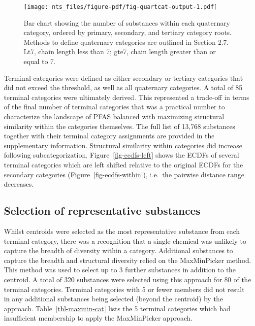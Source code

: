 \documentclass[
  super,
  preprint,
  3p]{elsarticle}
\begin{document}
\begin{figure}

{\centering \texttt{[image: nts\_files/figure-pdf/fig-quartcat-output-1.pdf]}

}

\caption{\label{fig-quartcat}Bar chart showing the number of substances
within each quaternary category, ordered by primary, secondary, and
tertiary category roots. Methods to define quaternary categories are
outlined in Section 2.7. Lt7, chain length less than 7; gte7, chain
length greater than or equal to 7.}

\end{figure}

Terminal categories were defined as either secondary or tertiary
categories that did not exceed the threshold, as well as all quaternary
categories. A total of 85 terminal categories were ultimately derived.
This represented a trade-off in terms of the final number of terminal
categories that was a practical number to characterize the landscape of
PFAS balanced with maximizing structural similarity within the
categories themselves. The full list of 13,768 substances together with
their terminal category assignments are provided in the supplementary
information. Structural similarity within categories did increase
following subcategorization, Figure~\ref{fig-ecdfs-left} shows the ECDFs
of several terminal categories which are left shifted relative to the
original ECDFs for the secondary categories
(Figure~\ref{fig-ecdfs-within}), i.e.~the pairwise distance range
decreases.

\hypertarget{sec-maxmin-all}{%
\subsection{Selection of representative
substances}\label{sec-maxmin-all}}

Whilst centroids were selected as the most representative substance from
each terminal category, there was a recognition that a single chemical
was unlikely to capture the breadth of diversity within a category.
Additional substances to capture the breadth and structural diversity
relied on the MaxMinPicker method. This method was used to select up to
3 further substances in addition to the centroid. A total of 320
substances were selected using this approach for 80 of the terminal
categories. Terminal categories with 5 or fewer members did not result
in any additional substances being selected (beyond the centroid) by the
approach. Table~\ref{tbl-maxmin-cat} lists the 5 terminal categories
which had insufficient membership to apply the MaxMinPicker approach.
\end{document}
